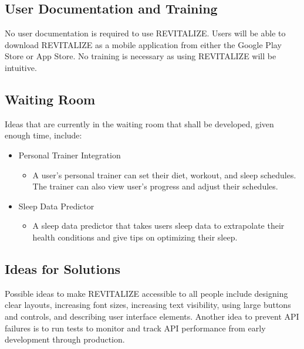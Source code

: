 \documentclass[12pt,letterpaper]{article}
\begin{document}
\subsection{User Documentation and Training}
No user documentation is required to use REVITALIZE. Users will be able to download REVITALIZE as a mobile application from either the Google Play Store or App Store. No training is necessary as using REVITALIZE will be intuitive.

\subsection{Waiting Room}
Ideas that are currently in the waiting room that shall be developed, given enough time, include:
\begin{itemize}
	\item Personal Trainer Integration
	\begin{itemize}
		\item A user's personal trainer can set their diet, workout, and sleep schedules. The trainer can also view user's progress and adjust their schedules.
	\end{itemize}
	\item Sleep Data Predictor
	\begin{itemize}
		\item A sleep data predictor that takes users sleep data to extrapolate their health conditions and give tips on optimizing their sleep.
	\end{itemize}
\end{itemize}

\subsection{Ideas for Solutions}
Possible ideas to make REVITALIZE accessible to all people include designing clear layouts, increasing font sizes, increasing text visibility, using large buttons and controls, and describing user interface elements. Another idea to prevent API failures is to run tests to monitor and track API performance from early development through production.


\newpage
\end{document}
